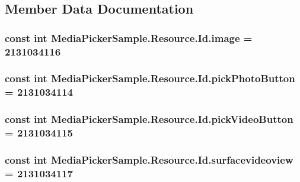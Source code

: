 \subsection{Member Data Documentation}
\hypertarget{class_media_picker_sample_1_1_resource_1_1_id_af3c2f37e172bce6310f0de0c023b15e4}{
\subsubsection[{image}]{\setlength{\rightskip}{0pt plus 5cm}const int Media\+Picker\+Sample.\+Resource.\+Id.\+image = 2131034116}}\label{class_media_picker_sample_1_1_resource_1_1_id_af3c2f37e172bce6310f0de0c023b15e4}
\hypertarget{class_media_picker_sample_1_1_resource_1_1_id_ae7fb9dc9e829e5c8b26f9a9745e056b8}{
\subsubsection[{pick\+Photo\+Button}]{\setlength{\rightskip}{0pt plus 5cm}const int Media\+Picker\+Sample.\+Resource.\+Id.\+pick\+Photo\+Button = 2131034114}}\label{class_media_picker_sample_1_1_resource_1_1_id_ae7fb9dc9e829e5c8b26f9a9745e056b8}
\hypertarget{class_media_picker_sample_1_1_resource_1_1_id_ae31e4d8e84fe54474c63d2277c05d5fd}{
\subsubsection[{pick\+Video\+Button}]{\setlength{\rightskip}{0pt plus 5cm}const int Media\+Picker\+Sample.\+Resource.\+Id.\+pick\+Video\+Button = 2131034115}}\label{class_media_picker_sample_1_1_resource_1_1_id_ae31e4d8e84fe54474c63d2277c05d5fd}
\hypertarget{class_media_picker_sample_1_1_resource_1_1_id_a26f8999ca47b4dfe5266e5dd1e3a1ef0}{
\subsubsection[{surfacevideoview}]{\setlength{\rightskip}{0pt plus 5cm}const int Media\+Picker\+Sample.\+Resource.\+Id.\+surfacevideoview = 2131034117}}\label{class_media_picker_sample_1_1_resource_1_1_id_a26f8999ca47b4dfe5266e5dd1e3a1ef0}
